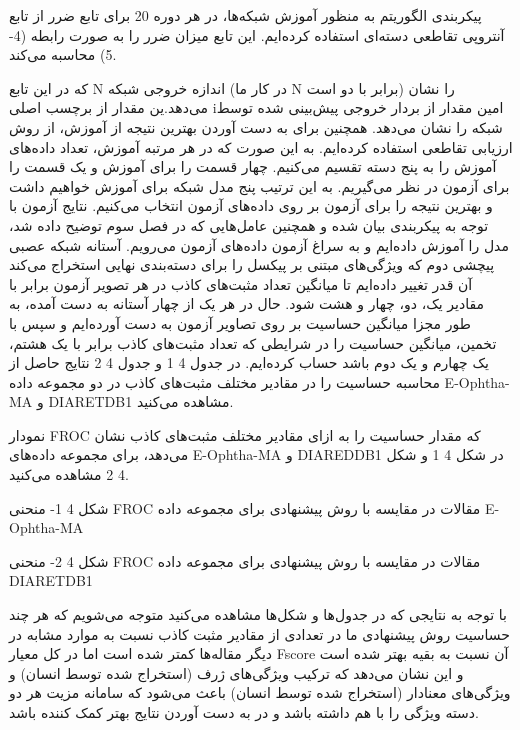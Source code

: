 پیکربندی الگوریتم
به منظور آموزش شبکه‌ها، در هر دوره 20%
برای تابع ضرر از تابع آنتروپی تقاطعی دسته‌ای  استفاده کرده‌‌ایم. این تابع میزان ضرر را به صورت رابطه (4-5) محاسبه می‌کند.

که در این تابع N اندازه خروجی شبکه (در کار ما N برابر با دو است) را نشان می‌دهد.ین مقدار از برچسب اصلی  iامین مقدار از بردار خروجی پیش‌بینی شده توسط شبکه را نشان می‌دهد. 
همچنین برای به دست آوردن بهترین نتیجه از آموزش، از روش ارزیابی تقاطعی استفاده کرده‌ایم. به این صورت که در هر مرتبه آموزش، تعداد داده‌های آموزش را به پنج دسته تقسیم می‌کنیم. چهار قسمت را برای آموزش و یک قسمت را برای آزمون در نظر می‌گیریم. به این ترتیب پنج مدل شبکه برای آموزش خواهیم داشت و بهترین نتیجه را برای آزمون بر روی داده‌های آزمون انتخاب می‌کنیم.
نتایج آزمون 
با توجه به پیکربندی بیان شده و همچنین عامل‌هایی که در فصل سوم توضیح داده شد، مدل را آموزش داده‌ایم و به سراغ آزمون داده‌های آزمون می‌رویم. آستانه شبکه عصبی پیچشی دوم که ویژگی‌های مبتنی بر پیکسل را برای دسته‌بندی نهایی استخراج می‌کند آن قدر تغییر داده‌ایم تا میانگین تعداد مثبت‌های کاذب در هر تصویر آزمون برابر با مقادیر یک، دو، چهار و هشت شود.
حال در هر یک از چهار آستانه به دست آمده، به طور مجزا میانگین حساسیت بر روی تصاویر آزمون به دست آورده‌ایم و سپس با تخمین، میانگین حساسیت را در شرایطی که تعداد مثبت‌های کاذب برابر با یک هشتم، یک چهارم و یک دوم باشد حساب کرده‌ایم. در جدول ‏4 1 و جدول ‏4 2 نتایج حاصل از محاسبه حساسیت را در مقادیر مختلف مثبت‌های کاذب در دو مجموعه داده E-Ophtha-MA و DIARETDB1 مشاهده می‌کنید.



نمودار FROC که مقدار حساسیت را به ازای مقادیر مختلف مثبت‌های کاذب نشان می‌دهد، برای مجموعه داده‌های E-Ophtha-MA و DIAREDDB1 در شکل ‏4 1 و شکل ‏4 2 مشاهده می‌کنید.

 
شکل ‏4 1- منحنی FROC مقالات در مقایسه با روش پیشنهادی برای مجموعه داده E-Ophtha-MA




 
شکل ‏4 2- منحنی FROC مقالات در مقایسه با روش پیشنهادی برای مجموعه داده DIARETDB1

با توجه به نتایجی که در جدول‌ها و شکل‌ها مشاهده می‌کنید متوجه می‌شویم که هر چند حساسیت روش پیشنهادی ما در تعدادی از مقادیر مثبت کاذب نسبت به موارد مشابه در دیگر مقاله‌ها کمتر شده است اما در کل معیار Fscore آن نسبت به بقیه بهتر شده است و این نشان می‌دهد که ترکیب ویژگی‌های ژرف (استخراج شده توسط انسان) و ویژگی‌های معنادار (استخراج شده توسط انسان) باعث می‌شود که سامانه مزیت هر دو دسته ویژگی را با هم داشته باشد و در به دست آوردن نتایج بهتر کمک کننده باشد.


